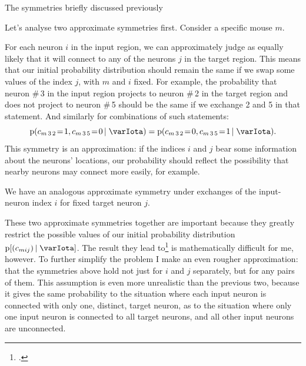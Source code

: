 \documentclass[\ifafour a4paper,12pt,\else a5paper,10pt,\fi%
onecolumn,oneside,article,%
british%
]{memoir}
\theoremstyle{remark}
\theoremstyle{innote}
\newcommand*{\citep}{\footcites}
\newcommand*{\pf}{\mathrm{p}}%
\renewcommand*{\|}[1][]{\nonscript\,#1\vert\nonscript\;\mathopen{}}
\newcommand*{\yI}{\varIota}
\newcommand*{\yc}{c}
\newcommand*{\eq}{\mathrel{\!=\!}}
\begin{document}
The symmetries briefly discussed previously

Let's analyse two approximate symmetries first. Consider a specific mouse
$m$.

For each neuron $i$ in the input region, we can approximately judge as
equally likely that it will connect to any of the neurons $j$ in the target
region. This means that our initial probability distribution should remain
the same if we swap some values of the index $j$, with $m$ and $i$ fixed.
For example, the probability that neuron \#\,3 in the input region projects
to neuron \#\,2 in the target region and does not project to neuron \#\,5
should be the same if we exchange 2 and 5 in that statement. And similarly
for combinations of such statements:
\begin{equation}
  \label{eq:example_exch_j}
  \pf(\yc_{m\,3\,2} \eq 1, \yc_{m\,3\,5} \eq 0 \| \yI )
=  \pf(\yc_{m\,3\,2} \eq 0, \yc_{m\,3\,5} \eq 1 \| \yI ).
\end{equation}
This symmetry is an approximation: if the indices $i$ and $j$ bear some
information about the neurons' locations, our probability should reflect
the possibility that nearby neurons may connect more easily, for example.

We have an analogous approximate symmetry under exchanges of the
input-neuron index $i$ for fixed target neuron $j$.

These two approximate symmetries together are important because they
greatly restrict the possible values of our initial probability
distribution $\pf[(\yc_{mij}) \| \yI]$. The result they lead
to\citep{hoover1979,aldous1981,diaconisetal1981b} is mathematically
difficult for me, however. To further simplify the problem I make an even
rougher approximation: that the symmetries above hold not just for $i$ and
$j$ separately, but for any pairs of them. This assumption is even more
unrealistic than the previous two, because it gives the same probability to
the situation where each input neuron is connected with only one, distinct,
target neuron, as to the situation where only one input neuron is connected
to all target neurons, and all other input neurons are unconnected.
\end{document}
